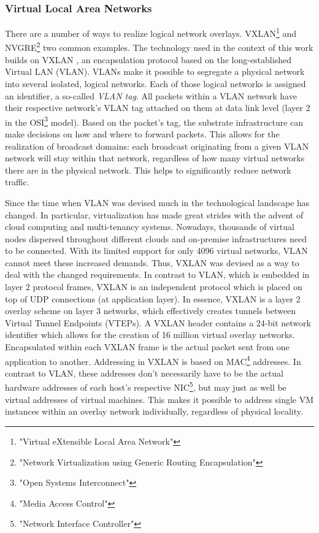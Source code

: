 \subsubsection{Virtual Local Area Networks}
There are a number of ways to realize logical network overlays. VXLAN\footnote{"Virtual eXtensible Local Area Network"} and NVGRE\footnote{"Network Virtualization using Generic Routing Encapsulation"} two common examples. The technology used in the context of this work builds on VXLAN \cite{rfc7348}, an encapsulation protocol based on the long-established Virtual LAN (VLAN). VLANs make it possible to segregate a physical network into several isolated, logical networks. Each of those logical networks is assigned an identifier, a so-called \emph{VLAN tag}. All packets within a VLAN network have their respective network's VLAN tag attached on them at data link level (layer 2 in the OSI\footnote{"Open Systems Interconnect"} model). Based on the packet's tag, the substrate infrastructure can make decisions on how and where to forward packets. This allows for the realization of broadcast domains: each broadcast originating from a given VLAN network will stay within that network, regardless of how many virtual networks there are in the physical network. This helps to significantly reduce network traffic.

Since the time when VLAN was devised much in the technological landscape has changed. In particular, virtualization has made great strides with the advent of cloud computing and multi-tenancy systems. Nowadays, thousands of virtual nodes dispersed throughout different clouds and on-premise infrastructures need to be connected. With its limited support for only 4096 virtual networks, VLAN cannot meet these increased demands. Thus, VXLAN was devised as a way to deal with the changed requirements. In contrast to VLAN, which is embedded in layer 2 protocol frames, VXLAN is an independent protocol which is placed on top of UDP connections (at application layer). In essence, VXLAN is a layer 2 overlay scheme on layer 3 networks, which effectively creates tunnels between Virtual Tunnel Endpoints (VTEPs). A VXLAN header contains a 24-bit network identifier which allows for the creation of 16 million virtual overlay networks. Encapsulated within each VXLAN frame is the actual packet sent from one application to another. Addressing in VXLAN is based on MAC\footnote{"Media Access Control"} addresses. In contrast to VLAN, these addresses don't necessarily have to be the actual hardware addresses of each host's respective NIC\footnote{"Network Interface Controller"}, but may just as well be virtual addresses of virtual machines. This makes it possible to address single VM instances within an overlay network individually, regardless of physical locality. 


